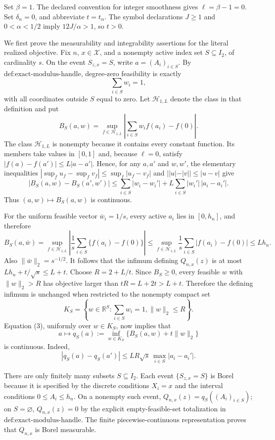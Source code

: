 Set \(\beta=1\).  The declared convention for integer smoothness gives \(\ell=\beta-1=0\).  Set \(\delta_n=0\), and abbreviate \(t=t_\alpha\).  The symbol declarations \(J\geq1\) and \(0<\alpha<1/2\) imply \(12J/\alpha>1\), so \(t>0\).

We first prove the measurability and integrability assertions for the literal realized objective.  Fix \(n\), \(x\in\mathcal X\), and a nonempty active index set \(S\subseteq I_2\), of cardinality \(s\).  On the event \(S_{z,x}=S\), write \(a=(A_i)_{i\in S}\).  By \(\text{def:exact-modulus-handle}\), degree-zero feasibility is exactly
\[
\sum_{i\in S}w_i=1,
\tag{1}
\]
with all coordinates outside \(S\) equal to zero.  Let \(\mathcal H_{1,L}\) denote the class in that definition and put
\[
B_S(a,w)=\sup_{f\in\mathcal H_{1,L}}
\left|\sum_{i\in S}w_i f(a_i)-f(0)\right|.
\tag{2}
\]
The class \(\mathcal H_{1,L}\) is nonempty because it contains every constant function.  Its members take values in \([0,1]\) and, because \(\ell=0\), satisfy \(|f(a)-f(a')|\leq L|a-a'|\).  Hence, for any \(a,a'\) and \(w,w'\), the elementary inequalities \(|\sup_f u_f-\sup_f v_f|\leq\sup_f|u_f-v_f|\) and \(||u|-|v||\leq|u-v|\) give
\[
\left|B_S(a,w)-B_S(a',w')\right|
\leq \sum_{i\in S}|w_i-w_i'|
+L\sum_{i\in S}|w_i'|\,|a_i-a_i'|.
\tag{3}
\]
Thus \((a,w)\mapsto B_S(a,w)\) is continuous.

For the uniform feasible vector \(\bar w_i=1/s\), every active \(a_i\) lies in \([0,h_n]\), and therefore
\[
B_S(a,\bar w)
=\sup_{f\in\mathcal H_{1,L}}
\left|\frac1s\sum_{i\in S}\{f(a_i)-f(0)\}\right|
\leq\sup_{f\in\mathcal H_{1,L}}
\frac1s\sum_{i\in S}|f(a_i)-f(0)|
\leq Lh_n.
\tag{4}
\]
Also \(\|\bar w\|_2=s^{-1/2}\).  It follows that the infimum defining \(Q_{n,x}(z)\) is at most \(Lh_n+t/\sqrt{s}\leq L+t\).  Choose \(R=2+L/t\).  Since \(B_S\geq0\), every feasible \(w\) with \(\|w\|_2>R\) has objective larger than \(tR=L+2t>L+t\).  Therefore the defining infimum is unchanged when restricted to the nonempty compact set
\[
K_S=\left\{w\in\mathbb R^S:\sum_{i\in S}w_i=1, \|w\|_2\leq R\right\}.
\tag{5}
\]
Equation (3), uniformly over \(w\in K_S\), now implies that
\[
a\longmapsto
q_S(a):=\inf_{w\in K_S}\{B_S(a,w)+t\|w\|_2\}
\tag{6}
\]
is continuous.  Indeed,
\[
|q_S(a)-q_S(a')|
\leq LR\sqrt{s}\,\max_{i\in S}|a_i-a_i'|.
\tag{7}
\]

There are only finitely many subsets \(S\subseteq I_2\).  Each event \(\{S_{z,x}=S\}\) is Borel because it is specified by the discrete conditions \(X_i=x\) and the interval conditions \(0\leq A_i\leq h_n\).  On a nonempty such event, \(Q_{n,x}(z)=q_S((A_i)_{i\in S})\); on \(S=\varnothing\), \(Q_{n,x}(z)=0\) by the explicit empty-feasible-set totalization in \(\text{def:exact-modulus-handle}\).  The finite piecewise-continuous representation proves that \(Q_{n,x}\) is Borel measurable.

